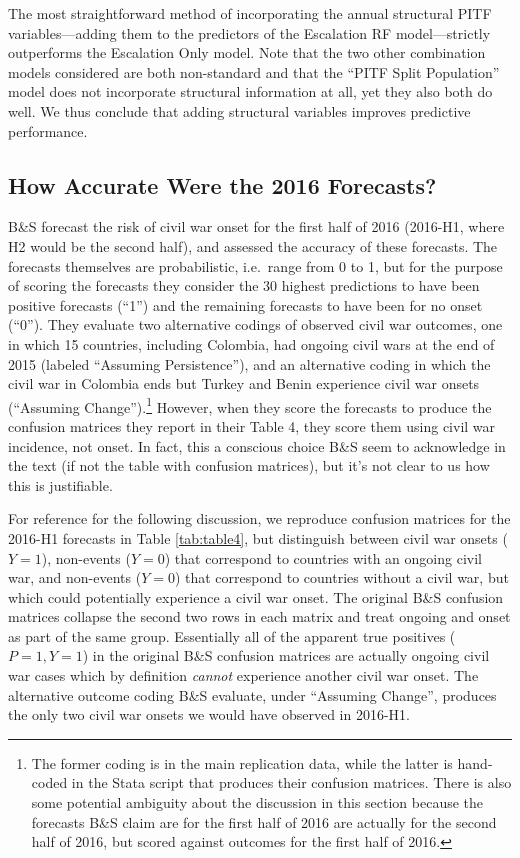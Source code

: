 \documentclass[
]{article}
\begin{document}
The most straightforward method of incorporating the annual structural PITF variables---adding them to the predictors of the Escalation RF model---strictly outperforms the Escalation Only model. Note that the two other combination models considered are both non-standard and that the ``PITF Split Population'' model does not incorporate structural information at all, yet they also both do well. We thus conclude that adding structural variables improves predictive performance.

\hypertarget{how-accurate-were-the-2016-forecasts}{%
\subsection{How Accurate Were the 2016 Forecasts?}\label{how-accurate-were-the-2016-forecasts}}

B\&S forecast the risk of civil war onset for the first half of 2016 (2016-H1, where H2 would be the second half), and assessed the accuracy of these forecasts. The forecasts themselves are probabilistic, i.e.~range from 0 to 1, but for the purpose of scoring the forecasts they consider the 30 highest predictions to have been positive forecasts (``1'') and the remaining forecasts to have been for no onset (``0''). They evaluate two alternative codings of observed civil war outcomes, one in which 15 countries, including Colombia, had ongoing civil wars at the end of 2015 (labeled ``Assuming Persistence''), and an alternative coding in which the civil war in Colombia ends but Turkey and Benin experience civil war onsets (``Assuming Change'').\footnote{\label{fn:leadDV}The former coding is in the main replication data, while the latter is hand-coded in the Stata script that produces their confusion matrices. There is also some potential ambiguity about the discussion in this section because the forecasts B\&S claim are for the first half of 2016 are actually for the second half of 2016, but scored against outcomes for the first half of 2016.} However, when they score the forecasts to produce the confusion matrices they report in their Table 4, they score them using civil war incidence, not onset. In fact, this a conscious choice B\&S seem to acknowledge in the text (if not the table with confusion matrices), but it's not clear to us how this is justifiable.

For reference for the following discussion, we reproduce confusion matrices for the 2016-H1 forecasts in Table \ref{tab:table4}, but distinguish between civil war onsets (\(Y=1\)), non-events (\(Y=0\)) that correspond to countries with an ongoing civil war, and non-events (\(Y=0\)) that correspond to countries without a civil war, but which could potentially experience a civil war onset. The original B\&S confusion matrices collapse the second two rows in each matrix and treat ongoing and onset as part of the same group. Essentially all of the apparent true positives (\(P=1, Y=1\)) in the original B\&S confusion matrices are actually ongoing civil war cases which by definition \emph{cannot} experience another civil war onset. The alternative outcome coding B\&S evaluate, under ``Assuming Change'', produces the only two civil war onsets we would have observed in 2016-H1.
\end{document}
